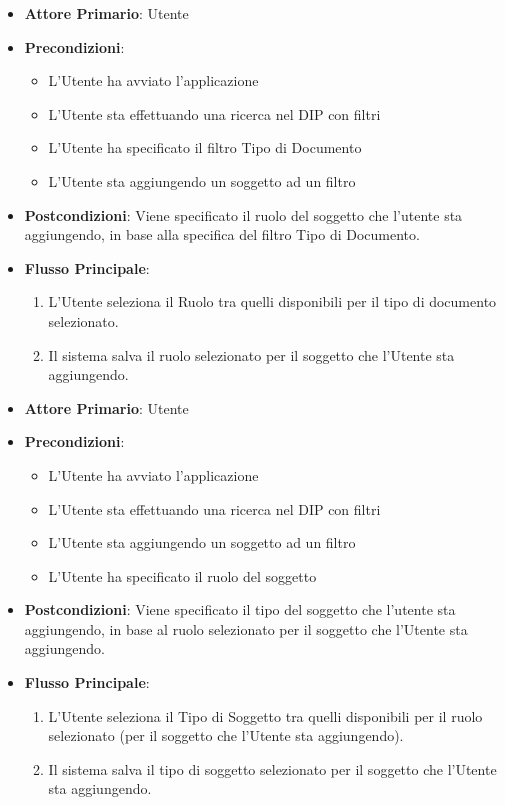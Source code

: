 \begin{itemize}
      \item \textbf{Attore Primario}: Utente
      \item \textbf{Precondizioni}: 
      \begin{itemize}
            \item L'Utente ha avviato l'applicazione
            \item L'Utente sta effettuando una ricerca nel DIP con filtri
            \item L'Utente ha specificato il filtro Tipo di Documento
            \item L'Utente sta aggiungendo un soggetto ad un filtro
      \end{itemize}
      \item \textbf{Postcondizioni}: Viene specificato il ruolo del soggetto che l'utente sta aggiungendo, in base alla specifica del filtro Tipo di Documento.
      \item \textbf{Flusso Principale}:
            \begin{enumerate}
                  \item L'Utente seleziona il Ruolo tra quelli disponibili per il tipo di documento selezionato.
                  \item Il sistema salva il ruolo selezionato per il soggetto che l'Utente sta aggiungendo.
            \end{enumerate}
\end{itemize}

\begin{itemize}
      \item \textbf{Attore Primario}: Utente
      \item \textbf{Precondizioni}: 
      \begin{itemize}
            \item L'Utente ha avviato l'applicazione
            \item L'Utente sta effettuando una ricerca nel DIP con filtri
            \item L'Utente sta aggiungendo un soggetto ad un filtro
            \item L'Utente ha specificato il ruolo del soggetto
      \end{itemize}
      \item \textbf{Postcondizioni}: Viene specificato il tipo del soggetto che l'utente sta aggiungendo, in base al ruolo selezionato per il soggetto che l'Utente sta aggiungendo.
      \item \textbf{Flusso Principale}:
            \begin{enumerate}
                  \item L'Utente seleziona il Tipo di Soggetto tra quelli disponibili per il ruolo selezionato (per il soggetto che l'Utente sta aggiungendo).
                  \item Il sistema salva il tipo di soggetto selezionato per il soggetto che l'Utente sta aggiungendo.
            \end{enumerate}
\end{itemize}

